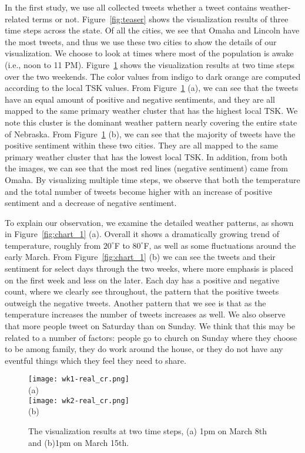 In the first study, we use all collected tweets whether a tweet contains weather-related terms or not. Figure~\ref{fig:teaser} shows the visualization results of three time steps across the state. 
Of all the cities, we see that Omaha and Lincoln have the most tweets, and thus we use these two cities to show the details of our visualization. We choose to look at times where most of the population is awake (i.e., noon to 11 PM). Figure~\ref{fig:cities} shows the visualization results at two time steps over the two weekends. The color values from indigo to dark orange are computed according to the local TSK values. From Figure~\ref{fig:cities} (a), we can see that the tweets have an equal amount of positive and negative sentiments, and they are all mapped to the same primary weather cluster that has the highest local TSK. We note this cluster is the dominant weather pattern nearly covering the entire state of Nebraska. From Figure~\ref{fig:cities} (b), we can see that the majority of tweets have the positive sentiment within these two cities. They are all mapped to the same primary weather cluster that has the lowest local TSK. In addition, from both the images, we can see that the most red lines (negative sentiment) came from Omaha. By visualizing multiple time steps, we observe that both the temperature and the total number of tweets become higher with an increase of positive sentiment and a decrease of negative sentiment.



To explain our observation, we examine the detailed weather patterns, as shown in Figure~\ref{fig:chart_1} (a). Overall it shows a dramatically growing trend of temperature, roughly from $20^\circ$F to $80^\circ$F, as well as some fluctuations around the early March. From Figure~\ref{fig:chart_1} (b) we can see the tweets and their sentiment for select days through the two weeks, where more emphasis is placed on the first week and less on the later. Each day has a positive and negative count, where we clearly see throughout, the pattern that the positive tweets outweigh the negative tweets. Another pattern that we see is that as the temperature increases the number of tweets increases as well. We also observe that more people tweet on Saturday than on Sunday. We think that this may be related to a number of factors: people go to church on Sunday where they choose to be among family, they do work around the house, or they do not have any eventful things which they feel they need to share.

\begin{figure}[t]
\begin{center}
\texttt{[image: wk1-real\_cr.png]} \\
\mbox{\small{(a)}}\\
\texttt{[image: wk2-real\_cr.png]} \\
\mbox{\small{(b)}}
\end{center}
\vspace{-.1in}
\caption{The visualization results at two time steps, (a) 1pm on March 8th and (b)1pm on March 15th.}
\label{fig:cities}
\end{figure}

